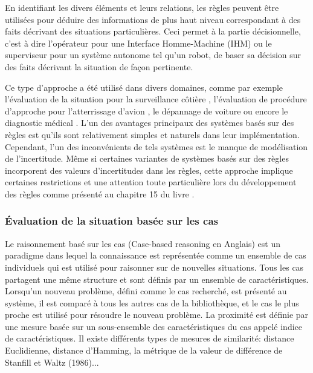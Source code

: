 \documentclass[a4paper,11pt,twoside]{StyleThese}
\begin{document}
En identifiant les divers éléments et leurs relations, les règles peuvent être utilisées pour déduire des informations de plus haut niveau correspondant à des faits décrivant des situations particulières. Ceci permet à la partie décisionnelle, c'est à dire l'opérateur pour une Interface Homme-Machine (IHM) ou le superviseur pour un système autonome tel qu'un robot, de baser sa décision sur des faits décrivant la situation de façon pertinente.

Ce type d'approche a été utilisé dans divers domaines, comme par exemple l'évaluation de la situation pour la surveillance côtière \cite{edlund2006rule}, l'évaluation de procédure d'approche pour l'atterrissage d'avion \cite{baron1980procru,milgram1984multi}, le dépannage de voiture ou encore le diagnostic médical \cite{swartout1985rule,miller1982internist}.
L'un des avantages principaux des systèmes basés sur des règles est qu'ils sont relativement simples et naturels dans leur implémentation.
Cependant, l'un des inconvénients de tels systèmes est le manque de modélisation de l'incertitude.
Même si certaines variantes de systèmes basés sur des règles incorporent des valeurs d'incertitudes dans les règles, cette approche implique certaines restrictions et une attention toute particulière lors du développement des règles comme présenté au chapitre 15 du livre \cite{russell2003artificial}.


\subsubsection{Évaluation de la situation basée sur les cas}

Le raisonnement basé sur les cas (Case-based reasoning en Anglais) est un paradigme dans lequel la connaissance est représentée comme un ensemble de cas individuels qui est utilisé pour raisonner sur de nouvelles situations. Tous les cas partagent une même structure et sont définis par un ensemble de caractéristiques. Lorsqu'un nouveau problème, défini comme le cas recherché, est présenté au système, il est comparé à tous les autres cas de la bibliothèque, et le cas le plus proche est utilisé pour résoudre le nouveau problème. La proximité est définie par une mesure basée sur un sous-ensemble des caractéristiques du cas appelé indice de caractéristiques. Il existe différents types de mesures de similarité: distance Euclidienne, distance d'Hamming, la métrique de la valeur de différence de Stanfill et Waltz (1986)...
\end{document}
